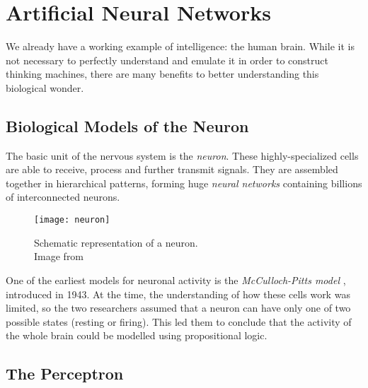

\section{Artificial Neural Networks}

We already have a working example of intelligence: the human brain. While it is not necessary to perfectly understand and emulate it in order to construct thinking machines, there are many benefits to better understanding this biological wonder.


\subsection{Biological Models of the Neuron}

The basic unit of the nervous system is the \emph{neuron}. These highly-specialized cells are able to receive, process and further transmit signals. They are assembled together in hierarchical patterns, forming huge \emph{neural networks} containing billions of interconnected neurons.

\begin{figure}[htbp]
    \centering
    \texttt{[image: neuron]}
    \caption{Schematic representation of a neuron. \\
    {\small Image from \cite{WikimediaCommonsNeuron}}}
\end{figure}

One of the earliest models for neuronal activity is the \emph{McCulloch-Pitts model} \cite{McCulloch1943}, introduced in 1943. At the time, the understanding of how these cells work was limited, so the two researchers assumed that a neuron can have only one of two possible states (resting or firing). This led them to conclude that the activity of the whole brain could be modelled using propositional logic.



\subsection{The Perceptron}

